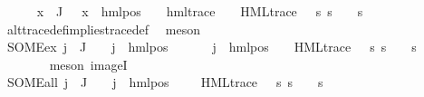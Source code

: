 \begin{isabellebody}
\ \ \ \ \isamarkupfalse%
\ {\isachardoublequoteopen}{\isasymforall}x\ {\isasymin}\ {\isasymPhi}{\isacharbackquote}{\kern0pt}J{\isachardot}{\kern0pt}\ {\isasymexists}{\isasymalpha}\ {\isasymphi}{\isachardot}{\kern0pt}\ x\ {\isacharequal}{\kern0pt}\ {\isacharparenleft}{\kern0pt}hml{\isacharunderscore}{\kern0pt}pos\ {\isasymalpha}\ {\isasymphi}{\isacharparenright}{\kern0pt}\ {\isasymand}\ hml{\isacharunderscore}{\kern0pt}trace\ {\isasymphi}\ {\isasymand}\ {\isacharparenleft}{\kern0pt}{\isasymexists}{\isasympsi}{\isachardot}{\kern0pt}\ HML{\isacharunderscore}{\kern0pt}trace\ {\isasympsi}\ {\isasymand}\ {\isacharparenleft}{\kern0pt}{\isasymforall}s{\isachardot}{\kern0pt}\ s\ {\isasymTurnstile}\ {\isasymphi}\ {\isasymlongleftrightarrow}\ s\ {\isasymTurnstile}\ {\isasympsi}{\isacharparenright}{\kern0pt}{\isacharparenright}{\kern0pt}{\isachardoublequoteclose}\isanewline
\ \ \ \ \ \ \isamarkupfalse%
\ alt{\isacharunderscore}{\kern0pt}trace{\isacharunderscore}{\kern0pt}def{\isacharunderscore}{\kern0pt}implies{\isacharunderscore}{\kern0pt}trace{\isacharunderscore}{\kern0pt}def\ \isamarkupfalse%
\ meson\isanewline
\ \ \ \ \isamarkupfalse%
\ SOME{\isacharunderscore}{\kern0pt}ex{\isacharcolon}{\kern0pt}\ {\isachardoublequoteopen}{\isasymforall}j\ {\isasymin}\ J{\isachardot}{\kern0pt}\ {\isasymexists}{\isasymalpha}{\isachardot}{\kern0pt}\ {\isacharparenleft}{\kern0pt}{\isasymexists}{\isasymphi}{\isachardot}{\kern0pt}\ {\isasymPhi}\ j\ {\isacharequal}{\kern0pt}\ hml{\isacharunderscore}{\kern0pt}pos\ {\isasymalpha}\ {\isasymphi}{\isacharparenright}{\kern0pt}\ {\isasymand}\ {\isacharparenleft}{\kern0pt}{\isasymexists}{\isasympsi}{\isachardot}{\kern0pt}\ {\isasymexists}{\isasymphi}{\isachardot}{\kern0pt}\ {\isasymPhi}\ j\ {\isacharequal}{\kern0pt}\ hml{\isacharunderscore}{\kern0pt}pos\ {\isasymalpha}\ {\isasymphi}\ {\isasymand}\ HML{\isacharunderscore}{\kern0pt}trace\ {\isasympsi}\ {\isasymand}\ {\isacharparenleft}{\kern0pt}{\isasymforall}s{\isachardot}{\kern0pt}\ s\ {\isasymTurnstile}\ {\isasymphi}\ {\isasymlongleftrightarrow}\ s\ {\isasymTurnstile}\ {\isasympsi}{\isacharparenright}{\kern0pt}{\isacharparenright}{\kern0pt}{\isachardoublequoteclose}\isanewline
\ \ \ \ \ \ \isamarkupfalse%
\ {\isacharparenleft}{\kern0pt}meson\ imageI{\isacharparenright}{\kern0pt}\isanewline
\ \ \ \ \isamarkupfalse%
\ SOME{\isacharunderscore}{\kern0pt}all{\isacharcolon}{\kern0pt}\ {\isachardoublequoteopen}{\isasymforall}j\ {\isasymin}\ J{\isachardot}{\kern0pt}\ {\isasymforall}{\isasymalpha}\ {\isasymphi}{\isachardot}{\kern0pt}\ {\isasymPhi}\ j\ {\isacharequal}{\kern0pt}\ hml{\isacharunderscore}{\kern0pt}pos\ {\isasymalpha}\ {\isasymphi}\ {\isasymlongrightarrow}\ {\isacharparenleft}{\kern0pt}{\isasymexists}{\isasympsi}{\isachardot}{\kern0pt}\ HML{\isacharunderscore}{\kern0pt}trace\ {\isasympsi}\ {\isasymand}\ {\isacharparenleft}{\kern0pt}{\isasymforall}s{\isachardot}{\kern0pt}\ s\ {\isasymTurnstile}\ {\isasymphi}\ {\isasymlongleftrightarrow}\ s\ {\isasymTurnstile}\ {\isasympsi}{\isacharparenright}{\kern0pt}{\isacharparenright}{\kern0pt}{\isachardoublequoteclose}\isanewline

\end{isabellebody}
